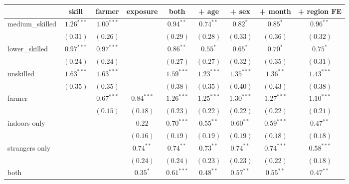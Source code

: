 
\begin{table}
\begin{center}
\begin{tabular}{l c c c c c c c c}
\hline
 & skill & farmer & exposure & both & + age & + sex & + month & + region FE \\
\hline
medium\_skilled & $1.26^{***}$ & $1.00^{***}$ &              & $0.94^{**}$  & $0.74^{**}$   & $0.82^{*}$    & $0.85^{*}$    & $0.96^{**}$   \\
                & $(0.31)$     & $(0.26)$     &              & $(0.29)$     & $(0.28)$      & $(0.33)$      & $(0.36)$      & $(0.32)$      \\
lower\_skilled  & $0.97^{***}$ & $0.97^{***}$ &              & $0.86^{**}$  & $0.55^{*}$    & $0.65^{*}$    & $0.70^{*}$    & $0.75^{*}$    \\
                & $(0.24)$     & $(0.24)$     &              & $(0.27)$     & $(0.27)$      & $(0.32)$      & $(0.35)$      & $(0.31)$      \\
unskilled       & $1.63^{***}$ & $1.63^{***}$ &              & $1.59^{***}$ & $1.23^{***}$  & $1.35^{***}$  & $1.36^{**}$   & $1.43^{***}$  \\
                & $(0.35)$     & $(0.35)$     &              & $(0.38)$     & $(0.35)$      & $(0.40)$      & $(0.43)$      & $(0.38)$      \\
farmer          &              & $0.67^{***}$ & $0.84^{***}$ & $1.26^{***}$ & $1.25^{***}$  & $1.30^{***}$  & $1.27^{***}$  & $1.10^{***}$  \\
                &              & $(0.15)$     & $(0.18)$     & $(0.23)$     & $(0.22)$      & $(0.22)$      & $(0.22)$      & $(0.21)$      \\
indoors only    &              &              & $0.22$       & $0.70^{***}$ & $0.55^{**}$   & $0.60^{**}$   & $0.59^{***}$  & $0.47^{**}$   \\
                &              &              & $(0.16)$     & $(0.19)$     & $(0.19)$      & $(0.19)$      & $(0.18)$      & $(0.18)$      \\
strangers only  &              &              & $0.74^{**}$  & $0.74^{**}$  & $0.73^{**}$   & $0.74^{**}$   & $0.74^{***}$  & $0.58^{***}$  \\
                &              &              & $(0.24)$     & $(0.24)$     & $(0.23)$      & $(0.23)$      & $(0.22)$      & $(0.18)$      \\
both            &              &              & $0.35^{*}$   & $0.61^{***}$ & $0.48^{**}$   & $0.57^{**}$   & $0.55^{**}$   & $0.47^{**}$   \\

\end{tabular}
\end{center}
\end{table}

